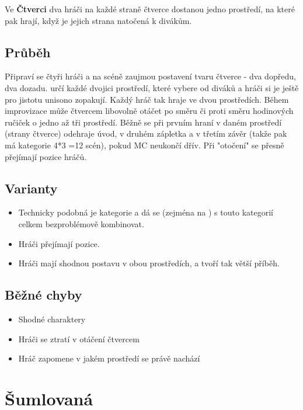 Ve \textbf{Čtverci}{} dva hráči na každé straně čtverce dostanou jedno prostředí, na které pak hrají, když je jejich strana natočená k divákům. 
 
\subsection{Průběh} Připraví se čtyři hráči a na scéně zaujmou postavení tvaru čtverce - dva dopředu, dva dozadu.  určí každé dvojici prostředí, které vybere od diváků a hráči si je ještě pro jistotu unisono zopakují. Každý hráč tak hraje ve dvou prostředích. Během improvizace  může čtvercem libovolně otáčet po směru či proti směru hodinových ručiček o jedno až tři prostředí. Běžně se při prvním hraní v daném prostředí (strany čtverce) odehraje úvod, v druhém zápletka a v třetím závěr (takže pak má kategorie 4*3 =12 scén), pokud MC neukončí dřív. 
Při "otočení"{} se přesně přejímají pozice hráčů. 
 
\subsection{ Varianty} \begin{itemize}
\item Technicky podobná je kategorie  a dá se (zejména na ) s touto kategorií celkem bezproblémově kombinovat.
\item Hráči přejímají pozice.
\item Hráči mají shodnou postavu v obou prostředích, a tvoří tak větší příběh.
\end{itemize}
 
\subsection{Běžné chyby} \begin{itemize}
\item Shodné charaktery
\item Hráči se ztratí v otáčení čtvercem
\item Hráč zapomene v jakém prostředí se právě nachází
\end{itemize}
 
 
 
 
 
\needspace{5cm} \section{Šumlovaná} \label{šumlovaná}  
 
